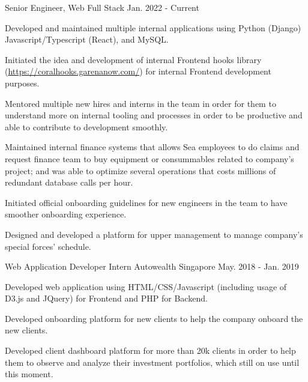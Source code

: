 \begin{cventries}
  \cventry
    {Senior Engineer, Web Full Stack} %
    {} %
    {} %
    {Jan. 2022 - Current} %
    {
      \begin{cvitems} %
        \item {Developed and maintained multiple internal applications using Python (Django) Javascript/Typescript (React), and MySQL.}
        \item {Initiated the idea and development of internal Frontend hooks library (\url{https://coralhooks.garenanow.com/}) for internal Frontend development purposes.}
        \item {Mentored multiple new hires and interns in the team in order for them to understand more on internal tooling and processes in order to be productive and able to contribute to development smoothly.}
        \item {Maintained internal finance systems that allows Sea employees to do claims and request finance team to buy equipment or consummables related to company's project; and was able to optimize several operations that costs millions of redundant database calls per hour.}
        \item {Initiated official onboarding guidelines for new engineers in the team to have smoother onboarding experience.}
        \item {Designed and developed a platform for upper management to manage company's special forces' schedule.}
      \end{cvitems}
    }

  \cventry
    {Web Application Developer Intern} %
    {Autowealth} %
    {Singapore} %
    {May. 2018 - Jan. 2019} %
    {
      \begin{cvitems} %
        \item {Developed web application using HTML/CSS/Javascript (including usage of D3.js and JQuery) for Frontend and PHP for Backend.}
        \item {Developed onboarding platform for new clients to help the company onboard the new clients.}
        \item {Developed client dashboard platform for more than 20k clients in order to help them to observe and analyze their investment portfolios, which still on use until this moment.}
      \end{cvitems}
    }

\end{cventries}

